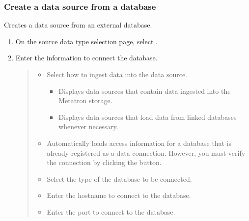 \documentclass[letterpaper,10pt,english]{sphinxmanual}
\begin{document}
\subsubsection{Create a data source from a database}
\label{\detokenize{discovery/part02/create_a_data_source:db}}\label{\detokenize{discovery/part02/create_a_data_source:create-datasource-from-db}}
Creates a data source from an external database.
\begin{enumerate}
\def\theenumi{\arabic{enumi}}
\def\labelenumi{\theenumi .}
\makeatletter\def\p@enumii{\p@enumi \theenumi .}\makeatother
\item {} 
On the source data type selection page, select .

\item {} 
Enter the information to connect the database.
\begin{quote}

\begin{figure}[H]
\centering

\noindent{}
\end{figure}
\begin{itemize}
\item {} 
 Select how to ingest data into the data source.
\begin{itemize}
\item {} 
 Displays data sources that contain data ingested into the Metatron storage.

\item {} 
 Displays data sources that load data from linked databases whenever necessary.

\end{itemize}

\item {} 
 Automatically loads access information for a database that is already registered as a data connection. However, you must verify the connection by clicking the  button.

\item {} 
 Select the type of the database to be connected.

\item {} 
 Enter the hostname to connect to the database.

\item {} 
 Enter the port to connect to the database.


\end{itemize}
\end{quote}
\end{enumerate}
\end{document}
